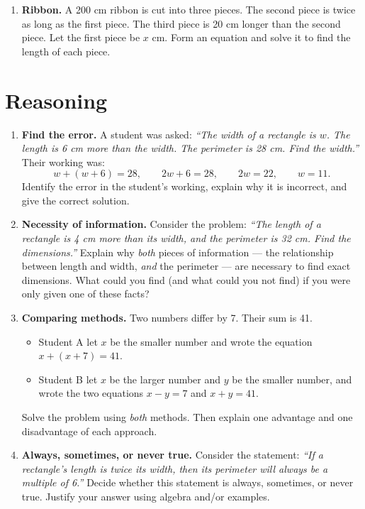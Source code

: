 \documentclass[11pt]{article}
\newcommand{\qspace}{\vspace{1.0cm}}
\begin{document}
\begin{enumerate}
  \item \textbf{Ribbon.} A 200 cm ribbon is cut into three pieces. The second piece is twice as long as the first piece. The third piece is 20 cm longer than the second piece. Let the first piece be $x$ cm. Form an equation and solve it to find the length of each piece.
  \qspace
\end{enumerate}

\newpage
\section{Reasoning}

\begin{enumerate}
  \item \textbf{Find the error.} A student was asked: \textit{``The width of a rectangle is $w$. The length is 6 cm more than the width. The perimeter is 28 cm. Find the width.''} Their working was:
  \[
    w + (w + 6) = 28, \qquad 2w + 6 = 28, \qquad 2w = 22, \qquad w = 11.
  \]
  Identify the error in the student's working, explain why it is incorrect, and give the correct solution.
  \qspace

  \item \textbf{Necessity of information.} Consider the problem: \textit{``The length of a rectangle is 4 cm more than its width, and the perimeter is 32 cm. Find the dimensions.''} Explain why \emph{both} pieces of information --- the relationship between length and width, \emph{and} the perimeter --- are necessary to find exact dimensions. What could you find (and what could you not find) if you were only given one of these facts?
  \qspace

  \item \textbf{Comparing methods.} Two numbers differ by 7. Their sum is 41.
  \begin{itemize}
    \item Student A let $x$ be the smaller number and wrote the equation $x + (x + 7) = 41$.
    \item Student B let $x$ be the larger number and $y$ be the smaller number, and wrote the two equations $x - y = 7$ and $x + y = 41$.
  \end{itemize}
  Solve the problem using \emph{both} methods. Then explain one advantage and one disadvantage of each approach.
  \qspace

  \item \textbf{Always, sometimes, or never true.} Consider the statement: \textit{``If a rectangle's length is twice its width, then its perimeter will always be a multiple of 6.''} Decide whether this statement is always, sometimes, or never true. Justify your answer using algebra and/or examples.
  \qspace


\end{enumerate}
\end{document}
